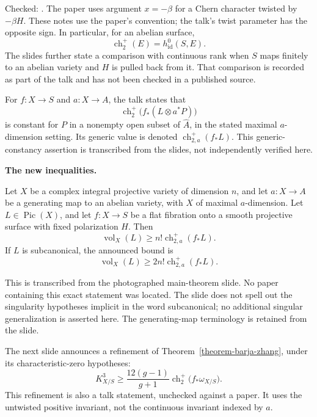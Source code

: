 Checked:
\cite[Theorems A and D]
{lahoz-rojas-chern-degree}.
The paper uses argument $x=-\beta$ for a
Chern character twisted by $-\beta H$.
These notes use the paper's convention;
the talk's twist parameter has the
opposite sign.
In particular, for an abelian surface,
$$
\operatorname{ch}_2^+(E)
=h^0_{\operatorname{id}}(S,E).
$$
The slides further state a comparison
with continuous rank when $S$ maps
finitely to an abelian variety and $H$
is pulled back from it. That comparison
is recorded as part of the talk and has
not been checked in a published source.

For $f\colon X\to S$ and $a\colon X\to A$,
the talk states that
$$
\operatorname{ch}_2^+
\bigl(f_*(L\otimes a^*P)\bigr)
$$
is constant for $P$ in a nonempty open
subset of $\widehat A$, in the stated
maximal $a$-dimension setting.
Its generic value is denoted
$\operatorname{ch}_{2,a}^+(f_*L)$.
This generic-constancy assertion is
transcribed from the slides, not
independently verified here.

\medskip\noindent
{\bf The new inequalities.}

\begin{theorem}
\label{theorem-barja-surface-slope}
Let $X$ be a complex integral projective
variety of dimension $n$, and let
$a\colon X\to A$ be a generating map to
an abelian variety, with $X$ of maximal
$a$-dimension.
Let $L\in\operatorname{Pic}(X)$,
and let $f\colon X\to S$ be a flat
fibration onto a smooth projective
surface with fixed polarization $H$.
Then
$$
\operatorname{vol}_X(L)
\geq n!\operatorname{ch}_{2,a}^+(f_*L).
$$
If $L$ is subcanonical, the announced
bound is
$$
\operatorname{vol}_X(L)
\geq 2n!\operatorname{ch}_{2,a}^+(f_*L).
$$
\end{theorem}

This is transcribed from the photographed
main-theorem slide. No paper containing
this exact statement was located.
The slide does not spell out the
singularity hypotheses implicit in the
word subcanonical; no additional
singular generalization is asserted here.
The generating-map terminology is retained
from the slide.

The next slide announces a refinement of
Theorem~\ref{theorem-barja-zhang}, under
its characteristic-zero hypotheses:
$$
K_{X/S}^3\geq
\frac{12(g-1)}{g+1}
\operatorname{ch}_2^+
\bigl(f_*\omega_{X/S}\bigr).
$$
This refinement is also a talk statement,
unchecked against a paper. It uses the
untwisted positive invariant, not the
continuous invariant indexed by $a$.

